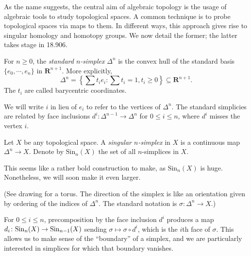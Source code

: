 As the name suggests, the central aim of algebraic topology is the usage of algebraic tools to study topological spaces. A common technique is to probe topological spaces via maps to them. In different ways, this approach gives rise to singular homology and homotopy groups. We now detail the former; the latter takes stage in 18.906.
\begin{definition}
For $n\geq 0$, the \emph{standard $n$-simplex} $\Delta^n$ is the convex hull of the standard basis $\{e_0,\cdots,e_n\}$ in $\mathbf{R}^{n+1}$. More explicitly,
$$\Delta^n = \left\{\sum t_i e_i : \sum t_i = 1, t_i\geq 0\right\}\subseteq\mathbf{R}^{n+1}.$$
The $t_i$ are called barycentric coordinates.
\end{definition}
We will write $i$ in lieu of $e_i$ to refer to the vertices of $\Delta^n$. The standard simplicies are related by face inclusions $d^i\colon \Delta^{n-1} \to \Delta^{n}$ for $0\leq i \leq n$, where $d^i$ misses the vertex $i$. 
\begin{definition}
Let $X$ be any topological space. A \emph{singular $n$-simplex} in $X$ is a continuous map $\Delta^n\to X$. Denote by $\mathrm{Sin}_n(X)$ the set of all $n$-simplices in $X$.
    
    This seems like a rather bold construction to make, as $\mathrm{Sin}_n(X)$ is huge. Nonetheless, we will soon make it even larger.
\end{definition}
(See drawing for a torus. The direction of the simplex is like an orientation given by ordering of the indices of $\Delta^n$. The standard notation is $\sigma:\Delta^n\to X$.)

For $0\leq i \leq n$, precomposition by the face inclusion $d^i$ produces a map $d_i\colon \mathrm{Sin}_n(X)\to\mathrm{Sin}_{n-1}(X)$ sending $\sigma\mapsto\sigma\circ d^i$, which is the $i$th face of $\sigma$. This allows us to make sense of the ``boundary'' of a simplex, and we are particularly interested in simplices for which that boundary vanishes.

